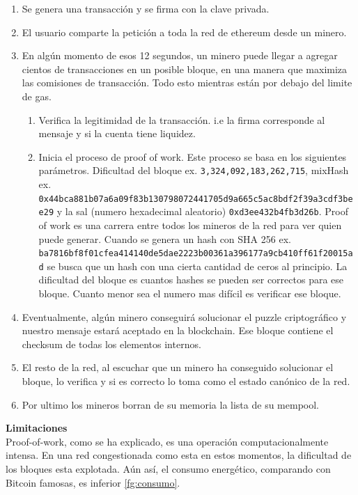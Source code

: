 \begin{enumerate}
    \item Se genera una transacción y se firma con la clave privada.
    \item El usuario comparte la petición a toda la red de ethereum desde un minero.
    \item En algún momento de esos 12 segundos, un minero puede llegar a agregar cientos de transacciones en un posible bloque, en una manera que maximiza las comisiones de transacción. Todo esto mientras están por debajo del limite de gas.
    \begin{enumerate}
        \item Verifica la legitimidad de la transacción. i.e la firma corresponde al mensaje y si la cuenta tiene liquidez.
        \item Inicia el proceso de proof of work. Este proceso se basa en los siguientes parámetros. Dificultad del bloque ex. \texttt{3,324,092,183,262,715}, mixHash ex.\\ \texttt{0x44bca881b07a6a09f83b130798072441705d9a665c5ac8bdf2f39a3cdf3bee29} y la sal (numero hexadecimal aleatorio) \texttt{0xd3ee432b4fb3d26b}. Proof of work es una carrera entre todos los mineros de la red para ver quien puede generar. Cuando se genera un hash con SHA 256 ex. \\\texttt{ba7816bf8f01cfea414140de5dae2223b00361a396177a9cb410ff61f20015ad} se busca que un hash con una cierta cantidad de ceros al principio. La dificultad del bloque es cuantos hashes se pueden ser correctos para ese bloque. Cuanto menor sea el numero mas difícil es verificar ese bloque.
    \end{enumerate}
    \item Eventualmente, algún minero conseguirá solucionar el puzzle criptográfico y nuestro mensaje estará aceptado en la blockchain. Ese bloque contiene el checksum de todas los elementos internos.
    \item El resto de la red, al escuchar que un minero ha conseguido solucionar el bloque, lo verifica y si es correcto lo toma como el estado canónico de la red.
    \item Por ultimo los mineros borran de su memoria la lista de su mempool.
\end{enumerate}
\textbf{Limitaciones}\\
Proof-of-work, como se ha explicado, es una operación computacionalmente intensa. En una red congestionada como esta en estos momentos, la dificultad de los bloques esta explotada. Aún así, el consumo energético, comparando con Bitcoin famosas, es inferior \ref{fg:consumo}.
